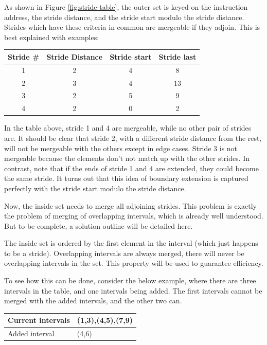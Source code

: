\documentclass[12pt,twoside]{reedthesis}
\begin{document}
			
			As shown in Figure \ref{fig:stride-table}, the outer set is keyed on the instruction address, the stride distance, and the stride start modulo the stride distance. Strides which have these criteria in common are mergeable if they adjoin.  This is best explained with examples:
			
			\begin{tabular}{ |c||c|c|c| } 
				\hline
				Stride \# & Stride Distance & Stride start & Stride last \\ 
				\hline
				\hline
				1 & 2 & 4 & 8 \\ \hline
				2 & 3 & 4 & 13 \\ \hline
				3 & 2  & 5  & 9 \\ \hline
				4 & 2  & 0  & 2 \\ 
				\hline
			\end{tabular}
		
			In the table above, stride 1 and 4 are mergeable, while no other pair of strides are. It should be clear that stride 2, with a different stride distance from the rest, will not be mergeable with the others except in edge cases. Stride 3 is not mergeable because the elements don't not match up with the other strides. In contrast, note that if the ends of stride 1 and 4 are extended, they could become the same stride. It turns out that this idea of boundary extension is captured perfectly with the stride start modulo the stride distance. 
			
			Now, the inside set needs to merge all adjoining strides. This problem is exactly the problem of merging of overlapping intervals, which is already well understood. But to be complete, a solution outline will be detailed here. %
			
			The inside set is ordered by the first element in the interval (which just happens to be a stride). Overlapping intervals are always merged, there will never be overlapping intervals in the set. This property will be used to guarantee efficiency.
			
			To see how this can be done, consider the below example, where there are three intervals in the table, and one intervals being added. The first intervals cannot be merged with the added intervals, and the other two can. 
			
			\newcommand{\bcl}{\cellcolor{black!50}}
			\begin{tabular}{ |l|l| } 
				\hline
				Current intervals & (1,3),(4,5),(7,9) \\ 
				\hline
				Added interval & (4,6) \\ 
				\hline
			\end{tabular}
			
\end{document}
